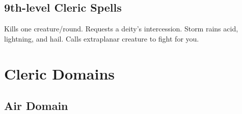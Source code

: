 \subsection{9th-level Cleric Spells}
\begin{spelllist}
   Kills one creature/round.
  \M Requests a deity's intercession.
   Storm rains acid, lightning, and hail.
   Calls extraplanar creature to fight for you.
\end{spelllist}

\section{Cleric Domains}\label{Cleric Domains}

\begin{comment}
\subsection{Example Domain}
\parhead{Domain Power}
\parhead{Channelled Domain Power}
\parhead{Greater Domain Power}
\parhead{Greater Channelled Domain Power}
\parhead{Domain Mastery}
\begin{spelllist}
  \spellhead[1]{}
  \spellhead[1]{}
  \spellhead[2]{}
  \spellhead[2]{}
  \spellhead[3]{}
  \spellhead[3]{}
  \spellhead[4]{}
  \spellhead[4]{}
  \spellhead[5]{}
  \spellhead[5]{}
  \spellhead[6]{}
  \spellhead[6]{}
  \spellhead[7]{}
  \spellhead[7]{}
  \spellhead[8]{}
  \spellhead[8]{}
  \spellhead[9]{}
  \spellhead[9]{}
\end{spelllist}
\end{comment}

\subsection{Air Domain}

